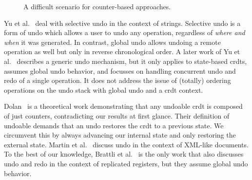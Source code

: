 \documentclass[sigplan,natbib=false,review]{acmart}
\begin{document}
\begin{figure}
\caption{
  A difficult scenario for counter-based approaches.
}\label{fig:anti-counter}
\end{figure}

Yu et al.~\cite{Yu2015undo} deal with selective undo in the context of strings.
Selective undo is a form of undo which allows a user to undo any operation,
regardless of \emph{where and when} it was generated.
In contrast, global undo allows undoing a remote operation as well
but only in reverse chronological order.
A later work of Yu et al.~\cite{Yu2019undo} describes a generic undo mechanism,
but it only applies to state-based \glspl*{crdt}, assumes global undo
behavior, and focusses on handling concurrent undo and redo of a single operation.
It does not address the issue of (totally) ordering operations on the undo stack
with global undo and a \gls{crdt} context.

Dolan~\cite{Dolan2020undoable} is a theoretical work demonstrating
that any undoable \gls{crdt} is composed of just counters, contradicting our
results at first glance.
Their definition of undoable demands that an undo restores the \gls{crdt}
to a previous state.
We circumvent this by always advancing our internal state and only restoring
the external state.
Martin et al.~\cite{Martin2010xml} discuss undo in the context of XML-like documents.
To the best of our knowledge, Brattli et al.~\cite{Brattli2021undo} is the
only work that also discusses undo and redo in the context of replicated registers,
but they assume global undo behavior.
\end{document}
